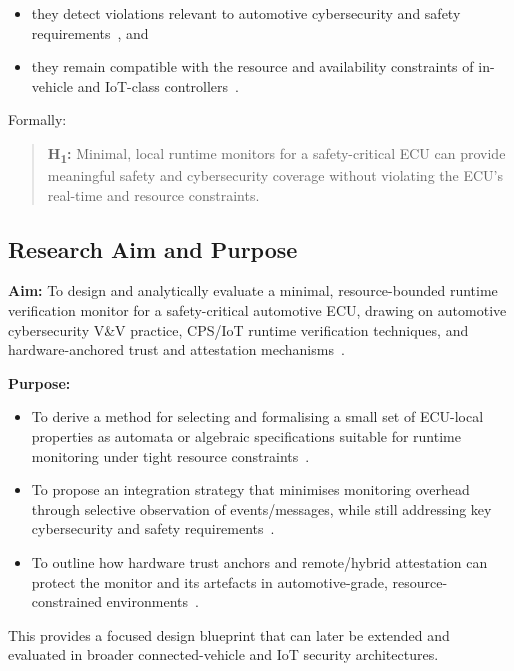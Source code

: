 \begin{itemize}
  \item they detect violations relevant to automotive cybersecurity and safety requirements~\cite{ekert2021cybersecurity,krichen2023survey,zhang2024context,dehoz2022iotdt,lorych2024hta}, and
  \item they remain compatible with the resource and availability constraints of in-vehicle and IoT-class controllers~\cite{williams2022survey,saadat2024rosmonitoring2,plappert2023hta}.
\end{itemize}

Formally:

\begin{quote}
\textbf{H\textsubscript{1}:} Minimal, local runtime monitors for a safety-critical ECU can provide meaningful safety and cybersecurity coverage without violating the ECU's real-time and resource constraints.
\end{quote}

\subsection{Research Aim and Purpose}

\textbf{Aim:} To design and analytically evaluate a minimal, resource-bounded runtime verification monitor for a safety-critical automotive ECU, drawing on automotive cybersecurity V\&V practice, CPS/IoT runtime verification techniques, and hardware-anchored trust and attestation mechanisms~\cite{ekert2021cybersecurity,zhang2024context,dehoz2022iotdt,lorych2024hta,saadat2024rosmonitoring2,plappert2023hta}.

\textbf{Purpose:}
\begin{itemize}
  \item To derive a method for selecting and formalising a small set of ECU-local properties as automata or algebraic specifications suitable for runtime monitoring under tight resource constraints~\cite{krichen2023survey,zhang2024context,dehoz2022iotdt}.
  \item To propose an integration strategy that minimises monitoring overhead through selective observation of events/messages, while still addressing key cybersecurity and safety requirements~\cite{ekert2021cybersecurity,krichen2023survey,zhang2024context,dehoz2022iotdt,lorych2024hta}.
  \item To outline how hardware trust anchors and remote/hybrid attestation can protect the monitor and its artefacts in automotive-grade, resource-constrained environments~\cite{williams2022survey,saadat2024rosmonitoring2,plappert2023hta}.
\end{itemize}

This provides a focused design blueprint that can later be extended and evaluated in broader connected-vehicle and IoT security architectures.